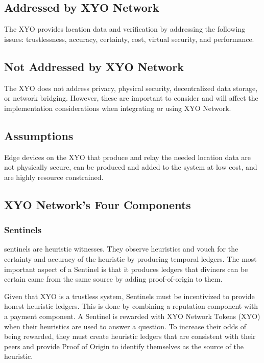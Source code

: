 \documentclass{article}
\begin{document}
\subsection {Addressed by XYO Network}
The \Gls{XYO} provides location data and verification by addressing the following issues: trustlessness, accuracy, \gls{certainty}, cost, virtual security, and performance.

\subsection {Not Addressed by XYO Network}
The \Gls{XYO} does not address privacy, physical security, decentralized data storage, or network bridging. However, these are important to consider and will affect the implementation considerations when integrating or using XYO Network.

\subsection {Assumptions}
Edge devices on the \Gls{XYO} that produce and relay the needed location data are not physically secure, can be produced and added to the system at low cost, and are highly resource constrained.

\subsection {XYO Network's Four Components}

\subsubsection {Sentinels}
\Glspl{sentinel} are \gls{heuristic} witnesses. They observe heuristics and vouch for the \gls{certainty} and \gls{accuracy} of the heuristic by producing temporal ledgers. The most important aspect of a Sentinel is that it produces ledgers that \Glspl{diviner} can be certain came from the same source by adding \Gls{proof-of-origin} to them.

Given that \Gls{XYO} is a trustless system, Sentinels must be incentivized to provide honest heuristic ledgers. This is done by combining a reputation component with a payment component. A Sentinel is rewarded with XYO Network Tokens (XYO) when their heuristics are used to answer a question. To increase their odds of being rewarded, they must create heuristic ledgers that are consistent with their peers and provide Proof of Origin to identify themselves as the source of the heuristic.
\end{document}
